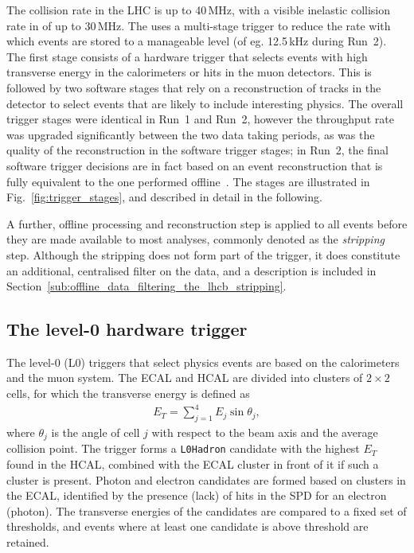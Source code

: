 The collision rate in the LHC is up to 40\,MHz, with a visible inelastic collision rate in \lhcb of up to 30\,MHz. The \lhcb uses a multi-stage trigger to reduce the rate with which events are stored to a manageable level (of eg. 12.5\,kHz during Run~2). The first stage consists of a hardware trigger that selects events with high transverse energy in the calorimeters or hits in the muon detectors. This is followed by two software stages that rely on a reconstruction of tracks in the detector to select events that are likely to include interesting physics.  The overall trigger stages were identical in Run~1 and Run~2, however the throughput rate was upgraded significantly between the two data taking periods, as was the quality of the reconstruction in the software trigger stages; in Run~2, the final software trigger decisions are in fact based on an event reconstruction that is fully equivalent to the  one performed offline~\cite{Trigger-Performance2}.  The stages are illustrated in Fig.~\ref{fig:trigger_stages}, and described in detail in the following.

A further, offline processing and reconstruction step is applied to all events before they are made available to most \lhcb analyses, commonly denoted as the \emph{stripping} step. Although the stripping does not form part of the \lhcb trigger, it does constitute an additional, centralised filter on the data, and a description is included in Section~\ref{sub:offline_data_filtering_the_lhcb_stripping}.



\subsection{The level-0 hardware trigger} %
\label{sub:the_level_0_hardware_trigger}

The level-0 (L0) triggers that select physics events are based on the calorimeters and the muon system. 
The ECAL and HCAL are divided into clusters of $2\times2$ cells, for which the transverse energy is defined as
\begin{align}
    E_T=\sum_{j=1}^4 E_j \sin \theta_j,
\end{align}
where $\theta_j$ is the angle of cell $j$ with respect to the beam axis and the average collision point. The trigger forms a \texttt{L0Hadron} candidate with the highest $E_T$ found in the HCAL, combined with the ECAL cluster in front of it if such a cluster is present. Photon and electron candidates are formed based on clusters in the ECAL, identified by the presence (lack) of hits in the SPD for an electron (photon). The transverse energies of the candidates are compared to a fixed set of thresholds, and events where at least one candidate is above threshold are retained.

